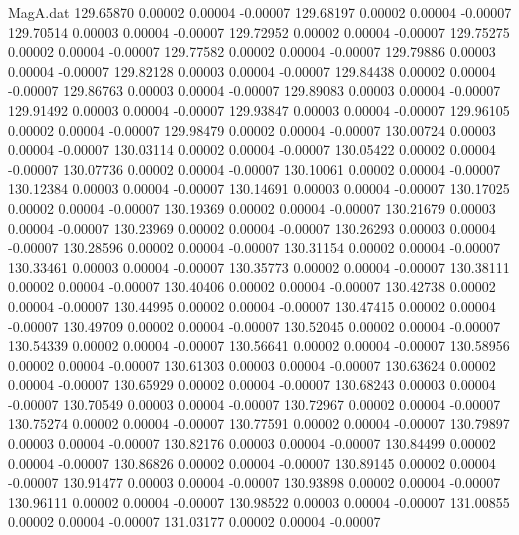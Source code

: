 \begin{filecontents}{MagA.dat}
 129.65870    0.00002    0.00004   -0.00007
 129.68197    0.00002    0.00004   -0.00007
 129.70514    0.00003    0.00004   -0.00007
 129.72952    0.00002    0.00004   -0.00007
 129.75275    0.00002    0.00004   -0.00007
 129.77582    0.00002    0.00004   -0.00007
 129.79886    0.00003    0.00004   -0.00007
 129.82128    0.00003    0.00004   -0.00007
 129.84438    0.00002    0.00004   -0.00007
 129.86763    0.00003    0.00004   -0.00007
 129.89083    0.00003    0.00004   -0.00007
 129.91492    0.00003    0.00004   -0.00007
 129.93847    0.00003    0.00004   -0.00007
 129.96105    0.00002    0.00004   -0.00007
 129.98479    0.00002    0.00004   -0.00007
 130.00724    0.00003    0.00004   -0.00007
 130.03114    0.00002    0.00004   -0.00007
 130.05422    0.00002    0.00004   -0.00007
 130.07736    0.00002    0.00004   -0.00007
 130.10061    0.00002    0.00004   -0.00007
 130.12384    0.00003    0.00004   -0.00007
 130.14691    0.00003    0.00004   -0.00007
 130.17025    0.00002    0.00004   -0.00007
 130.19369    0.00002    0.00004   -0.00007
 130.21679    0.00003    0.00004   -0.00007
 130.23969    0.00002    0.00004   -0.00007
 130.26293    0.00003    0.00004   -0.00007
 130.28596    0.00002    0.00004   -0.00007
 130.31154    0.00002    0.00004   -0.00007
 130.33461    0.00003    0.00004   -0.00007
 130.35773    0.00002    0.00004   -0.00007
 130.38111    0.00002    0.00004   -0.00007
 130.40406    0.00002    0.00004   -0.00007
 130.42738    0.00002    0.00004   -0.00007
 130.44995    0.00002    0.00004   -0.00007
 130.47415    0.00002    0.00004   -0.00007
 130.49709    0.00002    0.00004   -0.00007
 130.52045    0.00002    0.00004   -0.00007
 130.54339    0.00002    0.00004   -0.00007
 130.56641    0.00002    0.00004   -0.00007
 130.58956    0.00002    0.00004   -0.00007
 130.61303    0.00003    0.00004   -0.00007
 130.63624    0.00002    0.00004   -0.00007
 130.65929    0.00002    0.00004   -0.00007
 130.68243    0.00003    0.00004   -0.00007
 130.70549    0.00003    0.00004   -0.00007
 130.72967    0.00002    0.00004   -0.00007
 130.75274    0.00002    0.00004   -0.00007
 130.77591    0.00002    0.00004   -0.00007
 130.79897    0.00003    0.00004   -0.00007
 130.82176    0.00003    0.00004   -0.00007
 130.84499    0.00002    0.00004   -0.00007
 130.86826    0.00002    0.00004   -0.00007
 130.89145    0.00002    0.00004   -0.00007
 130.91477    0.00003    0.00004   -0.00007
 130.93898    0.00002    0.00004   -0.00007
 130.96111    0.00002    0.00004   -0.00007
 130.98522    0.00003    0.00004   -0.00007
 131.00855    0.00002    0.00004   -0.00007
 131.03177    0.00002    0.00004   -0.00007

\end{filecontents}
